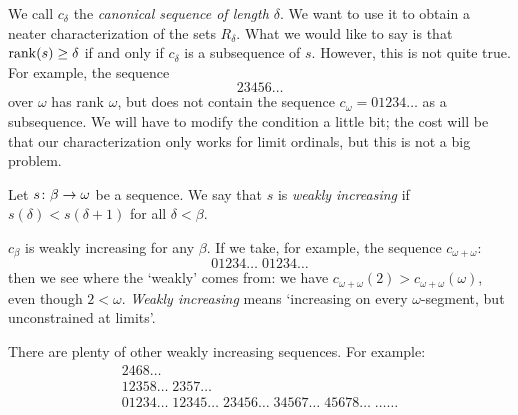 \documentclass[11pt]{article} %
\begin{document}
We call $c_\delta$ the \emph{canonical sequence of length $\delta$}.  We want to use it to obtain a neater characterization of the sets $R_\delta$.  What we would like to say is that $\operatorname{rank}(s)\ge\delta$ if and only if $c_\delta$ is a subsequence of $s$.  However, this is not quite true.  For example, the sequence
\[
  23456\dots
  \]
over $\omega$ has rank $\omega$, but does not contain the sequence $c_\omega=01234\dots$ as a subsequence.  We will have to modify the condition a little bit; the cost will be that our characterization only works for limit ordinals, but this is not a big problem.  

\begin{definition}
  Let $s\colon\beta\to\omega$ be a sequence.  We say that $s$ is \emph{weakly increasing} if $s(\delta)<s(\delta+1)$ for all $\delta<\beta$.
\end{definition}

\begin{example}
  $c_\beta$ is weakly increasing for any $\beta$.  If we take, for example, the sequence $c_{\omega+\omega}$:
  \[
    01234\dots\;01234\dots
    \]
  then we see where the `weakly' comes from: we have $c_{\omega+\omega}(2)>c_{\omega+\omega}(\omega)$, even though $2<\omega$.  \emph{Weakly increasing} means `increasing on every $\omega$-segment, but unconstrained at limits'.  

  There are plenty of other weakly increasing sequences.  For example:
  \begin{gather*}
    2468\dots \\
    12358\dots\;2357\dots \\
    01234\dots\;12345\dots\;23456\dots\;34567\dots\;45678\dots\;\dots\dots
  \end{gather*}
\end{example}

\pagebreak
\end{document}
